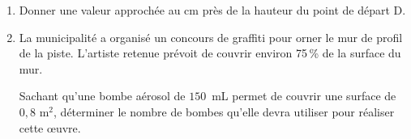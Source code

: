 \documentclass[10pt]{article}
\begin{document}
\begin{enumerate}
	\begin{enumerate}
		\item  Donner une valeur approchée au cm près de la hauteur du point de départ D.
		\item  La municipalité a organisé un concours de graffiti pour orner le mur de profil de la piste. L'artiste retenue prévoit de couvrir environ 75\,\% de la surface du mur.

Sachant qu'une bombe aérosol de $150$~mL permet de couvrir une surface de $0,8$ m$^2$, déterminer le nombre de bombes qu'elle devra utiliser pour réaliser cette œuvre.
	\end{enumerate}
\end{enumerate}

\bigskip
\end{document}
